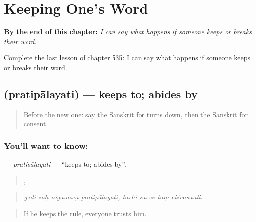 
\chapter{Keeping One's Word}
\label{ch:sa-keeping-one-s-word}

\begin{chapteropening}
\textbf{By the end of this chapter:} \emph{I can say what happens if someone keeps or breaks their word.}

Complete the last lesson of chapter 535: I can say what happens if someone keeps or breaks their word.
\end{chapteropening}

\section[\texorpdfstring{\sk{प्रतिपालयति} (pratipālayati)}{प्रतिपालयति (pratipālayati)}]{ (pratipālayati) — keeps to; abides by}

\label{lesson:SA-C535-pratipalayati}



\begin{quote}
Before the new one: say the Sanskrit for turns down, then the Sanskrit for consent.
\end{quote}

\subsection*{You'll want to know: }
\textbf{} — \emph{pratipālayati} — \textquotedblleft{}keeps to; abides by\textquotedblright{}.

\begin{quote}
   ,    
\end{quote}

\begin{quote}
\emph{yadi saḥ niyamaṃ pratipālayati, tarhi sarve taṃ viśvasanti.}
\end{quote}

\begin{quote}
If he keeps the rule, everyone trusts him.
\end{quote}

